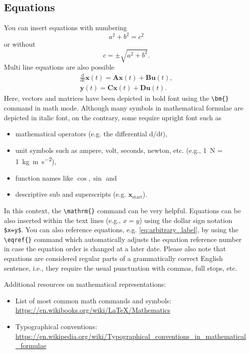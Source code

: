\documentclass[journal]{IEEEtran}
\begin{document}
\subsection{Equations}
You can insert equations with numbering
\begin{equation}
\label{eq:arbitrary_label}
    a^2+b^2=c^2
\end{equation}
or without
$$
c = \pm\sqrt{a^2+b^2}.
$$
Multi line equations are also possible
\begin{equation}
\begin{split}
    \frac{\mathrm{d}}{\mathrm{d}t}\bm{x}(t) = \bm{A}\bm{x}(t) + \bm{B}\bm{u}(t),\\
    \bm{y}(t) = \bm{C}\bm{x}(t) + \bm{D}\bm{u}(t).
\end{split}    
\end{equation}
Here, vectors and matrices have been depicted in bold font using the \verb!\bm{}! command in math mode. Although many symbols in mathematical formulae are depicted in italic font, on the contrary, some require upright font such as
\begin{itemize}
    \item mathematical operators (e.g. the differential $\mathrm{d}/\mathrm{d}t$),
    \item unit symbols such as ampere, volt, seconds, newton, etc.  (e.g., \SI{1}{\newton} = \SI{1}{\kilo\gram\metre\per\square\second}),
    \item function names like $\cos, \sin$ and
    \item descriptive sub and superscripts (e.g. $\bm{x}_{\mathrm{start}}$).
\end{itemize}
In this context, the \verb!\mathrm{}! command can be very helpful. Equations can be also inserted within the text lines (e.g., $x=y$) using the dollar sign notation \verb!$x=y$!. You can also reference equations, e.g. \eqref{eq:arbitrary_label}, by using the \verb!\eqref{}! command which automatically adjusts the equation reference number in case the equation order is changed at a later date. Please also note that equations are considered regular parts of a grammatically correct English sentence, i.e., they require the usual punctuation with commas, full stops, etc.

Additional resources on mathematical representations:
\begin{itemize}
    \item List of most common math commands and symbols: \url{https://en.wikibooks.org/wiki/LaTeX/Mathematics} 
\item Typographical conventions: \url{https://en.wikipedia.org/wiki/Typographical_conventions_in_mathematical_formulae}
\end{itemize}
\end{document}
